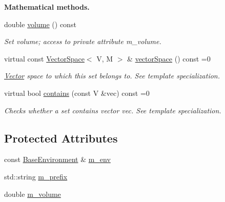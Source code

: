 \begin{Indent}{\bf Mathematical methods.}\par
\begin{DoxyCompactItemize}
\item 
double \hyperlink{class_q_u_e_s_o_1_1_vector_set_a3266f16e2672f5f3c929f22df085e545}{volume} () const 
\begin{DoxyCompactList}\small\item\em Set volume; access to private attribute m\-\_\-volume. \end{DoxyCompactList}\item 
virtual const \hyperlink{class_q_u_e_s_o_1_1_vector_space}{Vector\-Space}$<$ V, M $>$ \& \hyperlink{class_q_u_e_s_o_1_1_vector_set_a923421590baf5bf93cf066e528f927dc}{vector\-Space} () const =0
\begin{DoxyCompactList}\small\item\em \hyperlink{class_q_u_e_s_o_1_1_vector}{Vector} space to which {\ttfamily this} set belongs to. See template specialization. \end{DoxyCompactList}\item 
virtual bool \hyperlink{class_q_u_e_s_o_1_1_vector_set_ab59fe6ca67647f58920681e05165a9d0}{contains} (const V \&vec) const =0
\begin{DoxyCompactList}\small\item\em Checks whether a set contains vector {\ttfamily vec}. See template specialization. \end{DoxyCompactList}\end{DoxyCompactItemize}
\end{Indent}
\subsection*{Protected Attributes}
\begin{DoxyCompactItemize}
\item 
const \hyperlink{class_q_u_e_s_o_1_1_base_environment}{Base\-Environment} \& \hyperlink{class_q_u_e_s_o_1_1_vector_set_a77f3b57109bc1d89b4111f47458df770}{m\-\_\-env}
\item 
std\-::string \hyperlink{class_q_u_e_s_o_1_1_vector_set_a472995c02b59c8f3cd77230b39535cca}{m\-\_\-prefix}
\item 
double \hyperlink{class_q_u_e_s_o_1_1_vector_set_acd5cdcdbcbbce29daec684437f511e9f}{m\-\_\-volume}
\end{DoxyCompactItemize}

